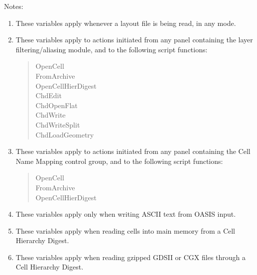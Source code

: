 Notes:
\begin{enumerate}
\item{These variables apply whenever a layout file is being read, in
any mode.}

\item{These variables apply to actions initiated from any panel
containing the layer filtering/aliasing module, and to the
following script functions:
\begin{quote}
{\vt OpenCell}\\
{\vt FromArchive}\\
{\vt OpenCellHierDigest}\\
{\vt ChdEdit}\\
{\vt ChdOpenFlat}\\
{\vt ChdWrite}\\
{\vt ChdWriteSplit}\\
{\vt ChdLoadGeometry}
\end{quote}}

\item{These variables apply to actions initiated from any panel
containing the {\cb Cell Name Mapping} control group, and to the
following script functions:
\begin{quote}
{\vt OpenCell}\\
{\vt FromArchive}\\
{\vt OpenCellHierDigest}
\end{quote}}

\item{These variables apply only when writing ASCII text from OASIS
input.}

\item{These variables apply when reading cells into main memory from
a Cell Hierarchy Digest.}

\item{These variables apply when reading gzipped GDSII or CGX files
through a Cell Hierarchy Digest.}
\end{enumerate}

